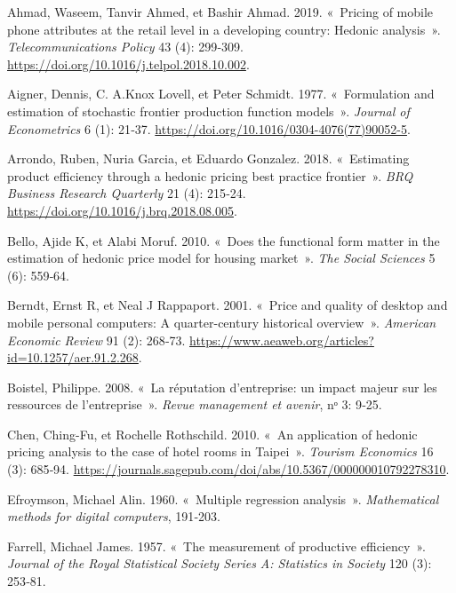 \documentclass[
  12pt,
]{report}
\newlength{\cslhangindent}
\newenvironment{CSLReferences}[2] %
 {\begin{list}{}{%
  \setlength{\itemindent}{0pt}
  \setlength{\leftmargin}{0pt}
  \setlength{\parsep}{0pt}
  \ifodd #1
   \setlength{\leftmargin}{\cslhangindent}
   \setlength{\itemindent}{-1\cslhangindent}
  \fi
  \setlength{\itemsep}{#2\baselineskip}}}
 {\end{list}}
\begin{document}
\label{refs}
\begin{CSLReferences}{1}{0}
Ahmad, Waseem, Tanvir Ahmed, et Bashir Ahmad. 2019. {«~Pricing of mobile
phone attributes at the retail level in a developing country: Hedonic
analysis~»}. \emph{Telecommunications Policy} 43 (4): 299‑309.
\url{https://doi.org/10.1016/j.telpol.2018.10.002}.

Aigner, Dennis, C. A.Knox Lovell, et Peter Schmidt. 1977. {«~Formulation
and estimation of stochastic frontier production function models~»}.
\emph{Journal of Econometrics} 6 (1): 21‑37.
\url{https://doi.org/10.1016/0304-4076(77)90052-5}.

Arrondo, Ruben, Nuria Garcia, et Eduardo Gonzalez. 2018. {«~Estimating
product efficiency through a hedonic pricing best practice frontier~»}.
\emph{BRQ Business Research Quarterly} 21 (4): 215‑24.
\url{https://doi.org/10.1016/j.brq.2018.08.005}.

Bello, Ajide K, et Alabi Moruf. 2010. {«~Does the functional form matter
in the estimation of hedonic price model for housing market~»}.
\emph{The Social Sciences} 5 (6): 559‑64.

Berndt, Ernst R, et Neal J Rappaport. 2001. {«~Price and quality of
desktop and mobile personal computers: A quarter-century historical
overview~»}. \emph{American Economic Review} 91 (2): 268‑73.
\url{https://www.aeaweb.org/articles?id=10.1257/aer.91.2.268}.

Boistel, Philippe. 2008. {«~La r{é}putation d'entreprise: un impact
majeur sur les ressources de l'entreprise~»}. \emph{Revue management et
avenir}, nᵒ 3: 9‑25.

Chen, Ching-Fu, et Rochelle Rothschild. 2010. {«~An application of
hedonic pricing analysis to the case of hotel rooms in Taipei~»}.
\emph{Tourism Economics} 16 (3): 685‑94.
\url{https://journals.sagepub.com/doi/abs/10.5367/000000010792278310}.

Efroymson, Michael Alin. 1960. {«~Multiple regression analysis~»}.
\emph{Mathematical methods for digital computers}, 191‑203.

Farrell, Michael James. 1957. {«~The measurement of productive
efficiency~»}. \emph{Journal of the Royal Statistical Society Series A:
Statistics in Society} 120 (3): 253‑81.


\end{CSLReferences}
\end{document}
